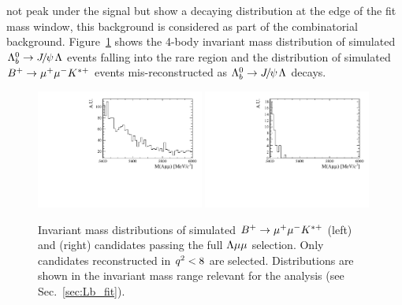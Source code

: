 not peak under the signal but show a decaying distribution at the edge of the fit mass window, this
background is considered as part of the combinatorial background.
Figure~\ref{fig:peakingBkgs} shows the 4-body invariant mass distribution of simulated $\Lb\ra\jpsi\Lz$
events falling into the rare \qsq region and the distribution of simulated $B^{+} \rightarrow{\ensuremath{\mu^+\mu^-}} K^{*+}$
events mis-reconstructed as $\Lb\ra\jpsi\Lz$ decays.
%
\begin{figure}
\centering
\includegraphics[width=0.49\textwidth]{Lmumu/figs/Bu2Kstplus_mass.pdf}
\includegraphics[width=0.49\textwidth]{Lmumu/figs/JpsiL_leakage_mass.pdf}
\caption{ Invariant mass distributions of simulated $B^{+} \rightarrow{\ensuremath{\mu^+\mu^-}} K^{*+}$ (left)
and \Lb\to\jpsi\Lz (right) candidates passing the full ${\Lambda}\mu\mu$ selection. Only \Lb\to\jpsi\Lz
candidates reconstructed in ${q^2} < 8$ \gevgevcccc are selected.
Distributions are shown in the invariant mass range relevant for the analysis 
(see Sec.~\ref{sec:Lb_fit}). }
\label{fig:peakingBkgs}
\end{figure}

